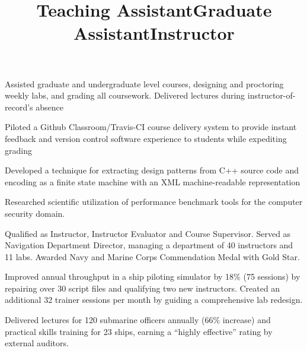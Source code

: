 \documentclass[line]{res}
\begin{document}
\begin{resume}
\title{{\bf Teaching Assistant}}
\begin{position}
\vspace*{-.2cm}
\begin{list2}
	\item Assisted graduate and undergraduate level courses, designing and proctoring weekly labs, and grading all coursework. Delivered lectures during instructor-of-record's absence
	\item Piloted a Github Classroom/Travis-CI course delivery system to provide instant feedback and version control software experience to students while expediting grading
\end{list2}
\end{position}

\title{{\bf Graduate Assistant}}
\begin{position}
\vspace*{-.2cm}
\begin{list2}
	\item Developed a technique for extracting design patterns from C++ source code and encoding as a finite state machine with an XML machine-readable representation
	\item Researched scientific utilization of performance benchmark tools for the computer security domain.
\end{list2}
\end{position}

\title{{\bf Instructor}}
\begin{position}
\vspace*{-.2cm}
\begin{list2}
	\item Qualified as Instructor, Instructor Evaluator and Course Supervisor. Served as Navigation Department Director, managing a department of 40 instructors and 11 labs. Awarded Navy and Marine Corps Commendation Medal with Gold Star.
	\item Improved annual throughput in a ship piloting simulator by 18\% (75 sessions) by repairing over 30 script files and qualifying two new instructors. Created an additional 32 trainer sessions per month by guiding a comprehensive lab redesign. 
	\item Delivered lectures for 120 submarine officers annually (66\% increase) and practical skills training for 23 ships, earning a ``highly effective'' rating by external auditors. 
\end{list2}
\end{position}


\end{resume}
\end{document}
